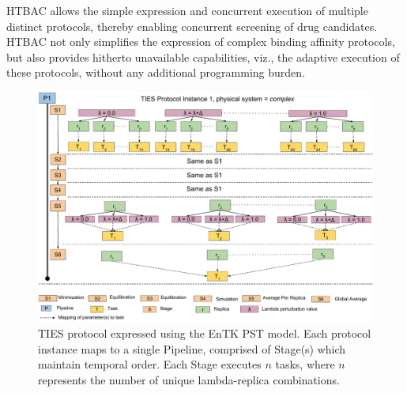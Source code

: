 


HTBAC allows the simple expression and concurrent execution of multiple
distinct protocols, thereby enabling concurrent screening of drug candidates.
HTBAC not only simplifies the expression of complex binding affinity
protocols, but also provides hitherto unavailable capabilities, viz., the
adaptive execution of these protocols, without any additional programming
burden. 



\begin{figure}
  \centering
   \includegraphics[width=\columnwidth]{figures/_TIES_EnTK_implementation.pdf}
  \caption{TIES protocol expressed using the EnTK PST model. Each protocol 
  instance maps to a single Pipeline, comprised of Stage(s) which maintain 
  temporal order. Each Stage executes $n$ tasks, where $n$ represents the 
  number of unique lambda-replica combinations.}
\label{fig:pst}
\end{figure}


